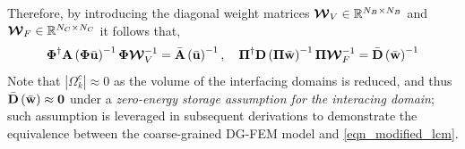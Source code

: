 Therefore, by introducing the diagonal weight matrices $\boldsymbol{\mathcal{W}}_V\in\mathbb{R}^{N_B\times N_B}$ and $\boldsymbol{\mathcal{W}}_F\in\mathbb{R}^{N_C\times N_C}$ it follows that,
\begin{equation}
    \boldsymbol{\Phi}^{\dagger}\mathbf{A}\left(\boldsymbol{\Phi}\bar{\mathbf{u}}\right)^{-1}\boldsymbol{\Phi}\boldsymbol{\mathcal{W}}_V^{-1} = \bar{\mathbf{A}}\left(\bar{\mathbf{u}}\right)^{-1},\quad \boldsymbol{\Pi}^{\dagger}\mathbf{D}\left(\boldsymbol{\Pi}\bar{\mathbf{w}}\right)^{-1}\boldsymbol{\Pi}\boldsymbol{\mathcal{W}}_F^{-1} = \bar{\mathbf{D}}\left(\bar{\mathbf{w}}\right)^{-1}
\end{equation}
Note that $\left|\Omega_k^c\right|\approx 0$ as the volume of the interfacing domains is reduced, and thus $\bar{\mathbf{D}}\left(\bar{\mathbf{w}}\right)\approx\mathbf{0}$ under a \emph{zero-energy storage assumption for the interacing domain}; such assumption is leveraged in subsequent derivations to demonstrate the equivalence between the coarse-grained DG-FEM model and \cref{eqn_modified_lcm}.

